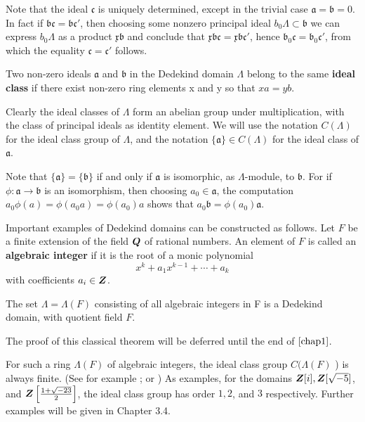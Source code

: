 \begin{rem}\label{rem:1.3}
	Note that the ideal $\mathfrak{c}$ is uniquely determined, except in the trivial case $\mathfrak{a}=\mathfrak{b}=0$. In fact if $\mathfrak{b} \mathfrak{c}=\mathfrak{b} \mathfrak{c}'$, then choosing some nonzero principal ideal $b_{0} \Lambda \subset \mathfrak{b}$ we can express $b_{0} \Lambda$ as a product $\mathfrak{x} \mathfrak{b}$ and conclude that $\mathfrak{x} \mathfrak{b} \mathfrak{c}=\mathfrak{x} \mathfrak{b} \mathfrak{c}'$, hence $\mathfrak{b}_{0} \mathfrak{c}=\mathfrak{b}_{0} \mathfrak{c}'$, from which the equality $\mathfrak{c}=\mathfrak{c}'$ follows.
\end{rem}

\begin{defn}
	Two non-zero ideals $\mathfrak{a}$ and $\mathfrak{b}$ in the Dedekind domain $\Lambda$ belong to the same \textbf{ideal class} if there exist non-zero ring elements x and y so that $xa=yb$.
\end{defn}

Clearly the ideal classes of $\Lambda$ form an abelian group under multiplication, with the class of principal ideals as identity element. We will use the notation $C(\Lambda)$ for the ideal class group of $\Lambda$, and the notation $\{\mathfrak{a}\} \in C(\Lambda)$ for the ideal class of $\mathfrak{a}$.

Note that $\{\mathfrak{a}\}=\{\mathfrak{b}\}$ if and only if $\mathfrak{a}$ is isomorphic, as $\Lambda$-module, to $\mathfrak{b}$. For if $\phi: \mathfrak{a} \to \mathfrak{b}$ is an isomorphism, then choosing $a_{0} \in \mathfrak{a}$, the computation $a_{0} \phi(a)=\phi\left(a_{0} a\right)=\phi\left(a_{0}\right) a$ shows that $a_{0} \mathfrak{b}=\phi\left(a_{0}\right) \mathfrak{a}$.

Important examples of Dedekind domains can be constructed as follows. Let $F$ be a finite extension of the field $\bm{Q}$ of rational numbers. An element of $F$ is called an \textbf{algebraic integer} if it is the root of a monic polynomial
\[
x^{k}+a_{1} x^{k-1}+\cdots+a_{k}
\]
with coefficients $a_{i} \in \bm{Z}$.

\begin{thm}\label{thm:1.4}
	The set $\Lambda=\Lambda(F)$ consisting of all algebraic integers in F is a Dedekind domain, with quotient field $F$.
\end{thm}

The proof of this classical theorem will be deferred until the end of $\Cref{chap1}$.

For such a ring $\Lambda(F)$ of algebraic integers, the ideal class group $C(\Lambda(F)$ ) is always finite. (See for example \cite{hecke:1970}; or \cite{Hunter_1969}) As examples, for the domains $\bm{Z}[i], \bm{Z}[\sqrt{-5}]$, and $\bm{Z}\left[ \frac{1+\sqrt{-23}}{2} \right]$, the ideal class group has order $1,2$, and $3$ respectively. Further examples will be given in Chapter 3.4.

